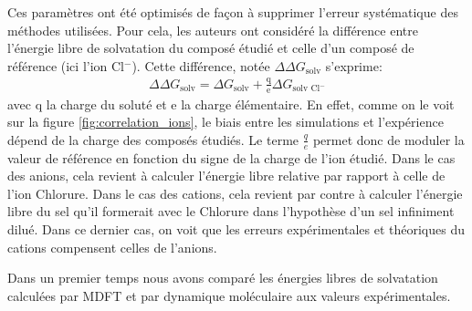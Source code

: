 Ces paramètres ont été optimisés de façon à supprimer l'erreur systématique des méthodes utilisées.
Pour cela, les auteurs ont considéré la différence entre l'énergie libre de solvatation du composé étudié et celle d'un composé de référence (ici l'ion Cl$^-$). Cette différence, notée $\Delta\Delta G_{\text{solv}}$ s'exprime:
\begin{eqnarray}
\Delta\Delta G_{\text{solv}} = \Delta G_{\text{solv}} + \frac{\text{q}}{\text{e}} \Delta G_{\text{solv Cl}^{-}}
\end{eqnarray}
\noindent avec q la charge du soluté et e la charge élémentaire. En effet, comme on le voit sur la figure \ref{fig:correlation_ions}, le biais entre les simulations et l'expérience dépend de la charge des composés étudiés. Le terme $\frac{q}{e}$ permet donc de moduler la valeur de référence en fonction du signe de la charge de l'ion étudié. Dans le cas des anions, cela revient à calculer l'énergie libre relative par rapport à celle de l'ion Chlorure. Dans le cas des cations, cela revient par contre à calculer l'énergie libre du sel qu'il formerait avec le Chlorure dans l'hypothèse d'un sel infiniment dilué. Dans ce dernier cas, on voit que les erreurs expérimentales et théoriques du cations compensent celles de l'anions.

Dans un premier temps nous avons comparé les énergies libres de solvatation calculées par MDFT et par dynamique moléculaire\cite{Horinek_rational_2009} aux valeurs expérimentales\cite{Marcus_simple_1994, Noyes_thermodynamics_1962}.



